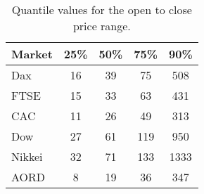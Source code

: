 \begin{table}[!htbp] \centering 
  \caption[Quantiles of the open to close price range.]{Quantile values for the open to close price range.} 
  \label{tab:OCQuantile}
\begin{tabular}{lcccc} 
\toprule 
Market & 25\% & 50\% & 75\% & 90\% \\ 
\midrule
Dax  & 16  & 39 & 75 & 508  \\ 
FTSE & 15  & 33 & 63 & 431 \\ 
CAC  & 11  & 26 & 49 & 313 \\ 
Dow  & 27 & 61  & 119 & 950 \\ 
Nikkei & 32  & 71  & 133 & 1333 \\ 
AORD   & 8  & 19  & 36 & 347 \\ 
\bottomrule
\end{tabular} 
\end{table} 



%
%


